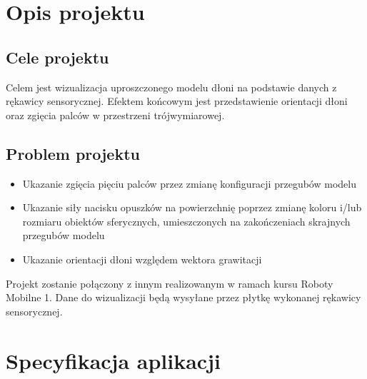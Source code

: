 \documentclass[10pt,a4paper]{article}
\begin{document}
\section{Opis projektu} \normalsize
\subsection{Cele projektu}
Celem jest wizualizacja uproszczonego modelu dłoni na podstawie danych z rękawicy sensorycznej. 
Efektem końcowym jest przedstawienie orientacji dłoni oraz zgięcia palców w przestrzeni trójwymiarowej. \\

\subsection{Problem projektu}
\begin{itemize}
\item Ukazanie zgięcia pięciu palców przez zmianę konfiguracji przegubów modelu
\item Ukazanie siły nacisku opuszków na powierzchnię poprzez zmianę koloru i/lub rozmiaru obiektów sferycznych, umieszczonych na zakończeniach skrajnych przegubów modelu
\item Ukazanie orientacji dłoni względem wektora grawitacji
\end{itemize}

Projekt zostanie połączony z innym realizowanym w ramach kursu Roboty Mobilne 1. Dane do wizualizacji będą wysyłane przez płytkę wykonanej rękawicy sensorycznej.

\section{Specyfikacja aplikacji}
\end{document}
